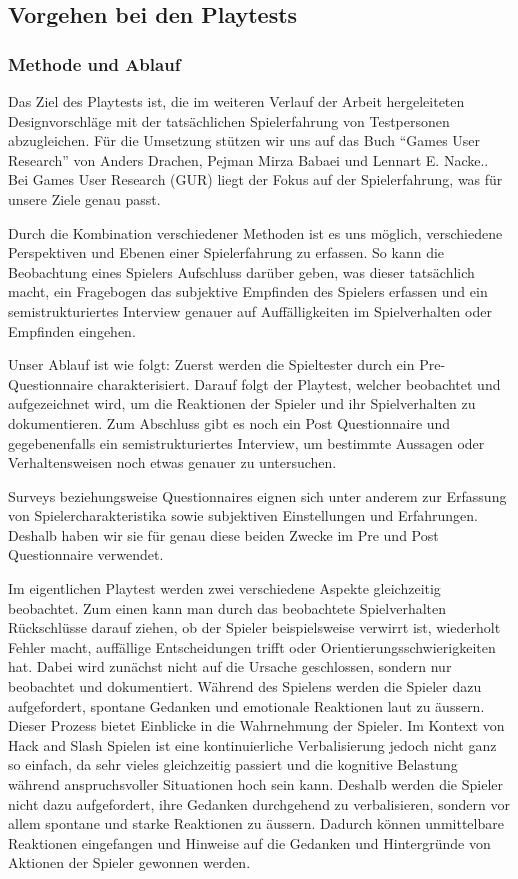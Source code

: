 \documentclass[../Main.tex]{subfiles}
\begin{document}
\subsection{Vorgehen bei den Playtests} \label{sec:VorgehenPlaytest}

\subsubsection{Methode und Ablauf} \label{sec:MethodePlaytest}
Das Ziel des Playtests ist, die im weiteren Verlauf der Arbeit hergeleiteten Designvorschläge mit der tatsächlichen Spielerfahrung von Testpersonen abzugleichen. Für die Umsetzung stützen wir uns auf das Buch \enquote{Games User Research} von Anders Drachen, Pejman Mirza Babaei und Lennart E. Nacke.\autocite{drachen2018gamesuserresearch}. Bei Games User Research (GUR) liegt der Fokus auf der Spielerfahrung, was für unsere Ziele genau passt.

Durch die Kombination verschiedener Methoden ist es uns möglich, verschiedene Perspektiven und Ebenen einer Spielerfahrung zu erfassen. So kann die Beobachtung eines Spielers Aufschluss darüber geben, was dieser tatsächlich macht, ein Fragebogen das subjektive Empfinden des Spielers erfassen und ein semistrukturiertes Interview genauer auf Auffälligkeiten im Spielverhalten oder Empfinden eingehen.

Unser Ablauf ist wie folgt: Zuerst werden die Spieltester durch ein Pre-Questionnaire charakterisiert. Darauf folgt der Playtest, welcher beobachtet und aufgezeichnet wird, um die Reaktionen der Spieler und ihr Spielverhalten zu dokumentieren. Zum Abschluss gibt es noch ein Post Questionnaire und gegebenenfalls ein semistrukturiertes Interview, um bestimmte Aussagen oder Verhaltensweisen noch etwas genauer zu untersuchen.

Surveys beziehungsweise Questionnaires eignen sich unter anderem zur Erfassung von Spielercharakteristika sowie subjektiven Einstellungen und Erfahrungen. Deshalb haben wir sie für genau diese beiden Zwecke im Pre und Post Questionnaire verwendet.

Im eigentlichen Playtest werden zwei verschiedene Aspekte gleichzeitig beobachtet. Zum einen kann man durch das beobachtete Spielverhalten Rückschlüsse darauf ziehen, ob der Spieler beispielsweise verwirrt ist, wiederholt Fehler macht, auffällige Entscheidungen trifft oder Orientierungsschwierigkeiten hat. Dabei wird zunächst nicht auf die Ursache geschlossen, sondern nur beobachtet und dokumentiert. Während des Spielens werden die Spieler dazu aufgefordert, spontane Gedanken und emotionale Reaktionen laut zu äussern. Dieser Prozess bietet Einblicke in die Wahrnehmung der Spieler. Im Kontext von Hack and Slash Spielen ist eine kontinuierliche Verbalisierung jedoch nicht ganz so einfach, da sehr vieles gleichzeitig passiert und die kognitive Belastung während anspruchsvoller Situationen hoch sein kann. Deshalb werden die Spieler nicht dazu aufgefordert, ihre Gedanken durchgehend zu verbalisieren, sondern vor allem spontane und starke Reaktionen zu äussern. Dadurch können unmittelbare Reaktionen eingefangen und Hinweise auf die Gedanken und Hintergründe von Aktionen der Spieler gewonnen werden.
\end{document}
